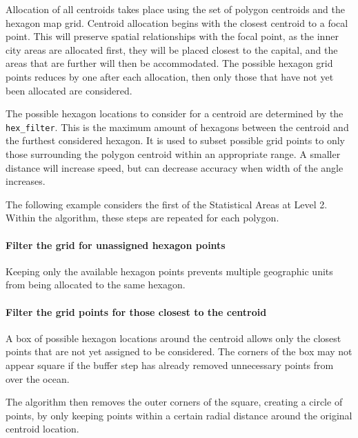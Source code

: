 \documentclass{monashthesis}
\begin{document}
Allocation of all centroids takes place using the set of polygon centroids and the hexagon map grid.
Centroid allocation begins with the closest centroid to a focal point.
This will preserve spatial relationships with the focal point, as the inner city areas are allocated first, they will be placed closest to the capital, and the areas that are further will then be accommodated.
The possible hexagon grid points reduces by one after each allocation, then only those that have not yet been allocated are considered.

The possible hexagon locations to consider for a centroid are determined by the \texttt{hex\_filter}. This is the maximum amount of hexagons between the centroid and the furthest considered hexagon. It is used to subset possible grid points to only those surrounding the polygon centroid within an appropriate range. A smaller distance will increase speed, but can decrease accuracy when width of the angle increases.

The following example considers the first of the Statistical Areas at Level 2.
Within the algorithm, these steps are repeated for each polygon.

\hypertarget{filter-the-grid-for-unassigned-hexagon-points}{%
\paragraph{Filter the grid for unassigned hexagon points}\label{filter-the-grid-for-unassigned-hexagon-points}}

Keeping only the available hexagon points prevents multiple geographic units from being allocated to the same hexagon.

\hypertarget{filter-the-grid-points-for-those-closest-to-the-centroid}{%
\paragraph{Filter the grid points for those closest to the centroid}\label{filter-the-grid-points-for-those-closest-to-the-centroid}}

A box of possible hexagon locations around the centroid allows only the closest points that are not yet assigned to be considered. The corners of the box may not appear square if the buffer step has already removed unnecessary points from over the ocean.

The algorithm then removes the outer corners of the square, creating a circle of points, by only keeping points within a certain radial distance around the original centroid location.
\end{document}
